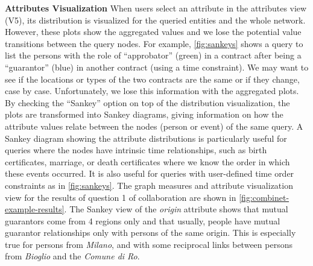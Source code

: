 \noindent\textbf{Attributes Visualization} When users select an attribute in the attributes view (V5), its distribution is visualized for the queried entities and the whole network.
However, these plots show the aggregated values and we lose the potential value transitions between the query nodes.
For example, \autoref{fig:sankeys} shows a query to list the persons with the role of ``approbator'' (green) in a contract after being a ``guarantor'' (blue) in another contract (using a time constraint).
We may want to see if the locations or types of the two contracts are the same or if they change, case by case.
Unfortunately, we lose this information with the aggregated plots.
By checking the ``Sankey'' option on top of the distribution visualization, the plots are transformed into Sankey diagrams, giving information on how the attribute values relate between the nodes (person or event) of the same query.
A Sankey diagram showing the attribute distributions is particularly useful for queries where the nodes have intrinsic time relationships, such as birth certificates, marriage, or death certificates where we know the order in which these events occurred.
It is also useful for queries with user-defined time order constraints as in \autoref{fig:sankeys}.
The graph measures and attribute visualization view for the results of question 1 of collaboration \pascal are shown in \autoref{fig:combinet-example-results}.
The Sankey view of the \textit{origin} attribute shows that mutual guarantors come from 4 regions only and that usually, people have mutual guarantor relationships only with persons of the same origin.
This is especially true for persons from \textit{Milano}, and with some reciprocal links between persons from \textit{Bioglio} and the \textit{Comune di Ro}.




